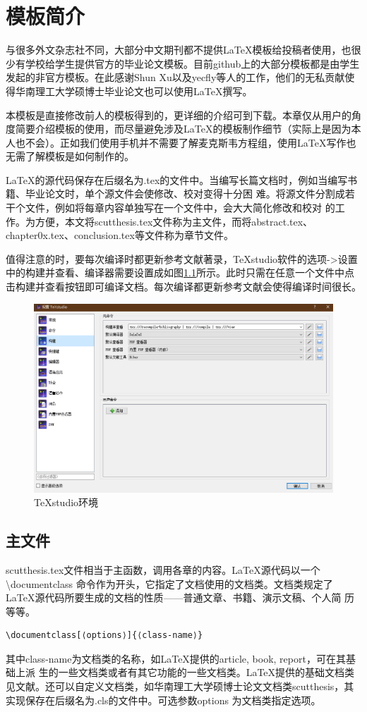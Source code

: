 \chapter{模板简介}
%
与很多外文杂志社不同，大部分中文期刊都不提供\LaTeX{}模板给投稿者使用，也很少有学校给学生提供官方的毕业论文模板。目前github上的大部分模板都是由学生发起的非官方模板。在此感谢Shun Xu以及yecfly等人的工作，他们的无私贡献使得华南理工大学硕博士毕业论文也可以使用\LaTeX{}撰写。

本模板是直接修改前人的模板得到的，更详细的介绍可到\parencite{_,_a}下载。本章仅从用户的角度简要介绍模板的使用，而尽量避免涉及\LaTeX{}的模板制作细节（实际上是因为本人也不会）。正如我们使用手机并不需要了解麦克斯韦方程组，使用\LaTeX{}写作也无需了解模板是如何制作的。

\LaTeX{}的源代码保存在后缀名为.tex的文件中。当编写长篇文档时，例如当编写书籍、毕业论文时，单个源文件会使修改、校对变得十分困
难。将源文件分割成若干个文件，例如将每章内容单独写在一个文件中，会大大简化修改和校对
的工作。为方便，本文将scutthesis.tex文件称为主文件，而将abstract.tex、chapter0x.tex、conclusion.tex等文件称为章节文件。

值得注意的时，要每次编译时都更新参考文献著录，TeXstudio软件的选项->设置中的构建并查看、编译器需要设置成如图\ref{TeXstudio}所示。此时只需在任意一个文件中点击构建并查看按钮即可编译文档。每次编译都更新参考文献会使得编译时间很长。
\begin{figure}[htbp]
	\centering
	\includegraphics[scale=0.55]{Fig/TeXstudio.png}
	\caption{\label{TeXstudio}TeXstudio环境}
\end{figure}

\section{主文件}
scutthesis.tex文件相当于主函数，调用各章的内容。\LaTeX{}源代码以一个\textbackslash{}documentclass 命令作为开头，它指定了文档使用的文档类。文档类规定了\LaTeX{}源代码所要生成的文档的性质——普通文章、书籍、演示文稿、个人简
历等等。
\begin{lstlisting}
\documentclass[⟨options⟩]{⟨class-name⟩}
\end{lstlisting}
其中class-name为文档类的名称，如\LaTeX{}提供的article, book, report，可在其基础上派
生的一些文档类或者有其它功能的一些文档类。\LaTeX{}提供的基础文档类见文献\parencite{_c}。还可以自定义文档类，如华南理工大学硕博士论文文档类scutthesis，其实现保存在后缀名为.cls的文件中。可选参数options 为文档类指定选项。


